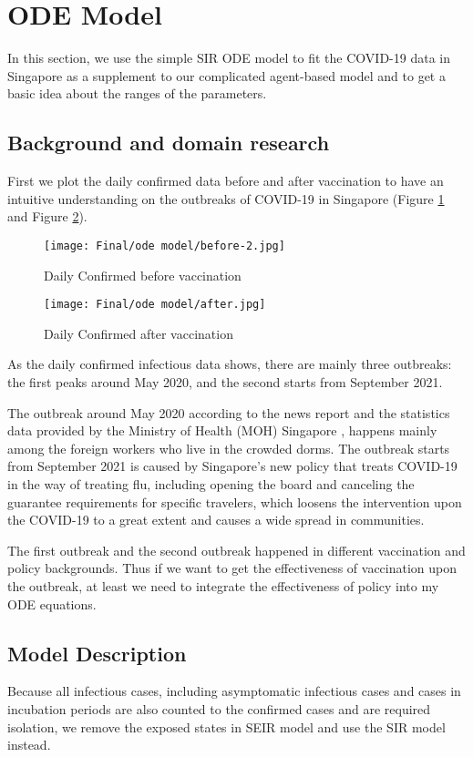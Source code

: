 \section{ODE Model}
\label{sec-ode}
In this section, we use the simple SIR ODE model to fit the COVID-19 data in Singapore as a supplement to our complicated agent-based model and to get a basic idea about the ranges of the parameters.
\subsection{Background and domain research}
First we plot the daily confirmed data before and after vaccination to have an intuitive understanding on the outbreaks of COVID-19 in Singapore (Figure \ref{sir0} and Figure \ref{sir1}).

\begin{figure}
	\centering
	\texttt{[image: Final/ode model/before-2.jpg]}
	\caption{Daily Confirmed before vaccination}
	\label{sir0}
\end{figure}
\begin{figure}
	\centering
	\texttt{[image: Final/ode model/after.jpg]}
	\caption{Daily Confirmed after vaccination}
	\label{sir1}
\end{figure}
As the daily confirmed infectious data shows, there are mainly three outbreaks: the first peaks around May 2020, and the second starts from September 2021.

The outbreak around May 2020 according to the news report and the statistics data provided by the Ministry of Health (MOH) Singapore , happens mainly among the foreign workers who live in the crowded dorms. The outbreak starts from September 2021 is caused by Singapore's new policy that treats COVID-19 in the way of treating flu, including opening the board and canceling the guarantee requirements for specific travelers, which loosens the intervention upon the COVID-19 to a great extent and causes a wide spread in communities.

The first outbreak and the second outbreak happened in different vaccination and policy backgrounds. Thus if we want to get the effectiveness of vaccination upon the outbreak, at least we need to integrate the effectiveness of policy into my ODE equations.




\subsection{Model Description}
Because all infectious cases, including asymptomatic infectious cases and cases in incubation periods are also counted to the confirmed cases and are required isolation, we remove the exposed states in SEIR model and use the SIR model instead.

